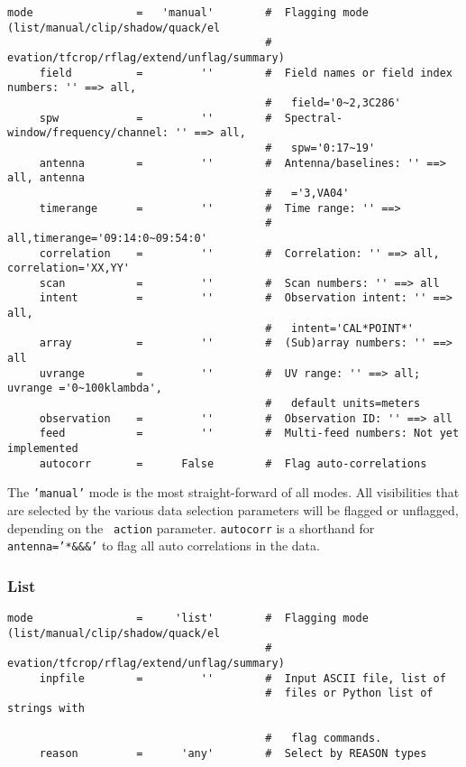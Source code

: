 \small
\begin{verbatim}
mode                =   'manual'        #  Flagging mode (list/manual/clip/shadow/quack/el
                                        #   evation/tfcrop/rflag/extend/unflag/summary)
     field          =         ''        #  Field names or field index numbers: '' ==> all,
                                        #   field='0~2,3C286'
     spw            =         ''        #  Spectral-window/frequency/channel: '' ==> all,
                                        #   spw='0:17~19'
     antenna        =         ''        #  Antenna/baselines: '' ==> all, antenna
                                        #   ='3,VA04'
     timerange      =         ''        #  Time range: '' ==>
                                        #   all,timerange='09:14:0~09:54:0'
     correlation    =         ''        #  Correlation: '' ==> all, correlation='XX,YY'
     scan           =         ''        #  Scan numbers: '' ==> all
     intent         =         ''        #  Observation intent: '' ==> all,
                                        #   intent='CAL*POINT*'
     array          =         ''        #  (Sub)array numbers: '' ==> all
     uvrange        =         ''        #  UV range: '' ==> all; uvrange ='0~100klambda',
                                        #   default units=meters
     observation    =         ''        #  Observation ID: '' ==> all
     feed           =         ''        #  Multi-feed numbers: Not yet implemented
     autocorr       =      False        #  Flag auto-correlations
\end{verbatim}
\normalsize

The {\tt 'manual'} mode is the most straight-forward of all modes. All
visibilities that are selected by the various data selection
parameters will be flagged or unflagged, depending on the {\tt
  action} parameter. {\tt autocorr} is a shorthand for {\tt
  antenna='*\&\&\&'} to flag all auto correlations in the data.


\subsubsection{List}
\label{section:edit.flagdata.mode.list}


\small
\begin{verbatim}
mode                =     'list'        #  Flagging mode (list/manual/clip/shadow/quack/el
                                        #   evation/tfcrop/rflag/extend/unflag/summary)
     inpfile        =         ''        #  Input ASCII file, list of
                                        #  files or Python list of strings with 

                                        #   flag commands.
     reason         =      'any'        #  Select by REASON types
\end{verbatim}
\normalsize

